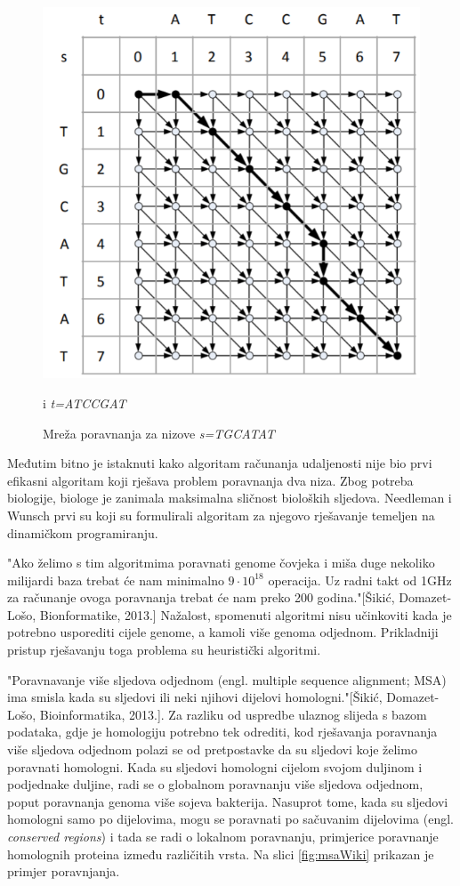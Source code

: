 \documentclass[times, utf8, zavrsni, numeric]{fer}
\begin{document}
\begin{figure}[htb]
	\includegraphics[width=\linewidth]{slike/grafPoravnanja.PNG}
	\centering
	\caption{Mreža poravnanja za nizove \textit{s=TGCATAT}} i \textit{t=ATCCGAT}
	\label{fig:grafPoravnjanja}
\end{figure}


Međutim bitno je istaknuti kako algoritam računanja udaljenosti nije bio prvi efikasni algoritam koji rješava problem poravnanja dva niza. Zbog potreba biologije, biologe je zanimala maksimalna sličnost bioloških sljedova. Needleman i Wunsch prvi su koji su formulirali algoritam za njegovo rješavanje temeljen na dinamičkom programiranju.
 

"Ako želimo s tim algoritmima poravnati genome čovjeka i miša duge nekoliko milijardi baza
trebat će nam minimalno $9\cdot10^{18}$ operacija. Uz radni takt od 1GHz za računanje ovoga
poravnanja trebat će nam preko 200 godina."[Šikić, Domazet-Lošo, Bionformatike, 2013.]
Nažalost, spomenuti algoritmi nisu učinkoviti kada je potrebno usporediti cijele genome, a kamoli više genoma odjednom. Prikladniji pristup rješavanju toga problema su heuristički algoritmi.

"Poravnavanje više sljedova odjednom (engl. multiple sequence alignment; MSA) ima
smisla kada su sljedovi ili neki njihovi dijelovi homologni."[Šikić, Domazet-Lošo, Bioinformatika, 2013.]. Za razliku od uspredbe ulaznog slijeda s bazom podataka, gdje je homologiju potrebno tek odrediti, kod rješavanja poravnanja više sljedova odjednom polazi se od pretpostavke da su sljedovi koje želimo poravnati homologni. Kada su sljedovi homologni cijelom svojom  duljinom i podjednake duljine, radi se o globalnom poravnanju više sljedova odjednom, poput poravnanja genoma više sojeva bakterija. Nasuprot tome, kada su sljedovi homologni samo po dijelovima, mogu se poravnati po sačuvanim dijelovima (engl. \textit{conserved regions}) i tada se radi o lokalnom poravnanju, primjerice poravnanje homolognih proteina između različitih vrsta.
Na slici \ref{fig:msaWiki} prikazan je primjer poravnjanja.
\end{document}
